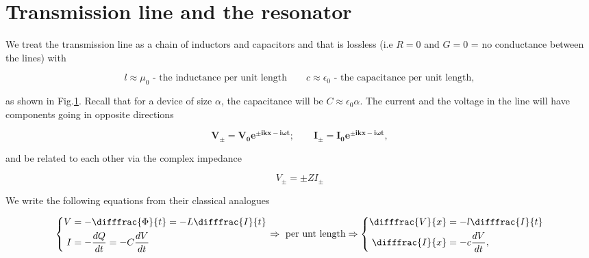 \section{Transmission line and the resonator}
 
  We treat the transmission line as a chain of inductors and capacitors and that is lossless (i.e $ R=0 $ and $ G = 0 $ = no conductance between the lines) with
  
  \begin{equation}
	  l \approx \mu_0 \text{ - the inductance per unit length}\qquad c \approx \epsilon_0 \text{ - the capacitance per unit length},
  \end{equation}
  
 \noindent as shown in Fig.\ref{transtLine}. Recall that for a device of size $ \alpha $, the capacitance will be $ C \approx \epsilon_0\alpha $. The current and the voltage in the line will have components going in opposite directions
 
 \begin{equation}
 	\label{tlineCurrentVoltage}
	 \mathbf{V_{\pm} = V_0e^{\pm ikx-i\omega t};\qquad I_{\pm} = I_0e^{\pm ikx-i\omega t}},
 \end{equation}
 
 \noindent and be related to each other via the complex impedance
 
 \begin{equation}
	 V_{\pm}= \pm ZI_{\pm}
 \end{equation}
 
 \begin{figure}[h]
 	\caption{ 	\label{transtLine}}
 \end{figure}

 \noindent We write the following equations from their classical analogues
 
 \begin{equation}
 	\left\lbrace \begin{aligned}
	 	V & = -\difffrac{\Phi}{t} = -L\difffrac{I}{t}\\
	 	I & = -\frac{dQ}{dt} = -C\frac{dV}{dt}
 	\end{aligned}\right.\Rightarrow \text{ per unt length} \Rightarrow \left\lbrace \begin{aligned}
 	\difffrac{V}{x} & = - l\difffrac{I}{t}\\
 	\difffrac{I}{x} & = - c\frac{dV}{dt},
 	\end{aligned}\right.
 	\label{tlineDiff}
 \end{equation}
 
